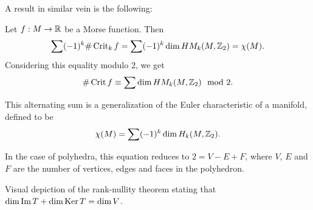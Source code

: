 A result in similar vein is the following:
\begin{theorem}
    Let $f: M \to  \R$ be a Morse function. Then
    \[
        \sum (-1)^{k} \# \Crit_k f = \sum (-1)^{k} \dim \HMf[k]{M, \Z_2}  = \chi(M)
    .\] 
    Considering this equality modulo $2$, we get
    \[
        \# \Crit f  \equiv \sum \dim \HMf[k]{M, \Z_2} \mod 2
    .\] 
\end{theorem}
\begin{remark}
    This alternating sum is a generalization of the Euler characteristic of a manifold, defined to be
    \[
    \chi(M) = \sum (-1)^{k} \dim H_k(M, \Z_2)
    .\] 

    In the case of polyhedra, this equation reduces to $2 = V - E + F$, where $V$, $E$ and  $F$ are the number of vertices, edges and faces in the polyhedron.
\end{remark}
\begin{marginfigure}
    \centering
    \caption{Visual depiction of the rank-nullity theorem stating that $\dim \Im T + \dim \Ker T = \dim V$.}
    \label{fig:linear-map-rank-nullity-theorem}
\end{marginfigure}

